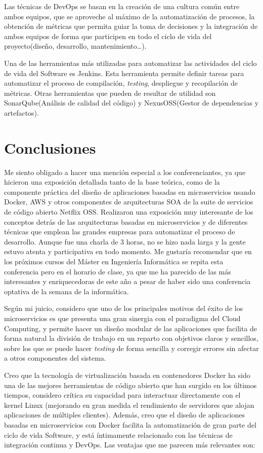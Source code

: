 Las técnicas de DevOps se basan en la creación de una cultura común entre ambos equipos, que se aproveche al máximo de la automatización de procesos, la obtención de métricas que permita guiar la toma de decisiones y la integración de ambos equipos de forma que participen en todo el ciclo de vida del proyecto(diseño, desarrollo, mantenimiento…).

Una de las herramientas más utilizadas para automatizar las actividades del ciclo de vida del Software es Jenkins. Esta herramienta permite definir tareas para automatizar el proceso de compilación, \textit{testing}, despliegue y recopilación de métricas. Otras herramientas que pueden de resultar de utilidad son SonarQube(Análisis de calidad del código) y NexusOSS(Gestor de dependencias y artefactos).


\section{Conclusiones}\label{sec:conclu}

Me siento obligado a hacer una mención especial a los conferenciantes, ya que hicieron una exposición detallada tanto de la base teórica, como de la componente práctica del diseño de aplicaciones basadas en microservicios usando Docker, AWS y otros componentes de arquitecturas SOA de la suite de servicios de código abierto Netflix OSS. Realizaron una exposición muy interesante de los conceptos detrás de las arquitecturas basadas en microservicios y de diferentes técnicas que emplean las grandes empresas para automatizar el proceso de desarrollo. Aunque fue una charla de 3 horas, no se hizo nada larga y la gente estuvo atenta y participativa en todo momento. Me gustaría recomendar que en los próximos cursos del Máster en Ingeniería Informática se repita esta conferencia pero en el horario de clase, ya que me ha parecido de las más interesantes y enriquecedoras de este año a pesar de haber sido una conferencia optativa de la semana de la informática.

Según mi juicio, considero que uno de los principales motivos del éxito de los microservicios es que presenta una gran sinergia con el paradigma del Cloud Computing, y permite hacer un diseño modular de las aplicaciones que facilita de forma natural la división de trabajo en un reparto con objetivos claros y sencillos, sobre los que se puede hacer \textit{testing} de forma sencilla y corregir errores sin afectar a otros componentes del sistema.

Creo que la tecnología de virtualización basada en contenedores Docker ha sido una de las mejores herramientas de código abierto que han surgido en los últimos tiempos, considero crítica su capacidad para interactuar directamente con el kernel Linux (mejorando en gran medida el rendimiento de servidores que alojan aplicaciones de múltiples clientes). Además, creo que el diseño de aplicaciones basadas en microservicios con Docker facilita la automatización de gran parte del ciclo de vida Software, y está íntimamente relacionado con las técnicas de integración continua y DevOps. Las ventajas que me parecen más relevantes son: 

